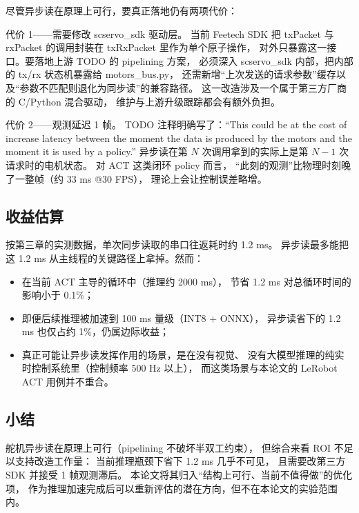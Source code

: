 尽管异步读在原理上可行，要真正落地仍有两项代价：

代价 1——需要修改 scservo\_sdk 驱动层。
当前 Feetech SDK 把 txPacket 与 rxPacket
的调用封装在 txRxPacket 里作为单个原子操作，
对外只暴露这一接口。要落地上游 TODO 的 pipelining 方案，
必须深入 scservo\_sdk 内部，把内部的 tx/rx 状态机暴露给 motors\_bus.py，
还需新增``上次发送的请求参数''缓存以及``参数不匹配则退化为同步读''的兼容路径。
这一改造涉及一个属于第三方厂商的 C/Python 混合驱动，
维护与上游升级跟踪都会有额外负担。

代价 2——观测延迟 1 帧。
TODO 注释明确写了：``This could be at the cost of increase latency between
the moment the data is produced by the motors and the moment it is used by a policy.''
异步读在第 $N$ 次调用拿到的实际上是第 $N-1$ 次请求时的电机状态。
对 ACT 这类闭环 policy 而言，
``此刻的观测''比物理时刻晚了一整帧（约 33 ms @30 FPS），
理论上会让控制误差略增。

\subsection{收益估算}\label{sec:async-read-roi}

按第三章的实测数据，单次同步读取的串口往返耗时约 1.2 ms。
异步读最多能把这 1.2 ms 从主线程的关键路径上拿掉。然而：
\begin{itemize}[leftmargin=2em]
  \item 在当前 ACT 主导的循环中（推理约 2000 ms），
        节省 1.2 ms 对总循环时间的影响小于 0.1\%；
  \item 即便后续推理被加速到 100 ms 量级（INT8 + ONNX），
        异步读省下的 1.2 ms 也仅占约 1\%，仍属边际收益；
  \item 真正可能让异步读发挥作用的场景，是在没有视觉、
        没有大模型推理的纯实时控制系统里（控制频率 500 Hz 以上），
        而这类场景与本论文的 LeRobot ACT 用例并不重合。
\end{itemize}

\subsection{小结}\label{sec:async-read-conclusion}

舵机异步读在原理上可行（pipelining 不破坏半双工约束），
但综合来看 ROI 不足以支持改造工作量：
当前推理瓶颈下省下 1.2 ms 几乎不可见，
且需要改第三方 SDK 并接受 1 帧观测滞后。
本论文将其归入``结构上可行、当前不值得做''的优化项，
作为推理加速完成后可以重新评估的潜在方向，但不在本论文的实验范围内。

